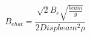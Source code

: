 \begin{equation} \label{eq:B_e_hat_equation}
B_{e hat} = \frac{\sqrt{2} B_{e} \sqrt{\frac{beam}{g}}}{2 Disp beam^{2} \rho}
\end{equation}
